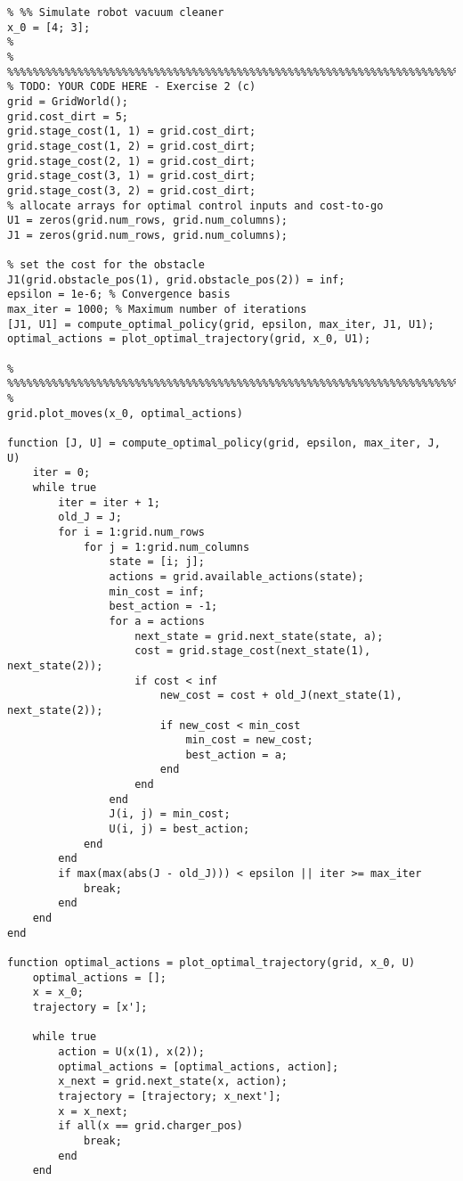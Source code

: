\documentclass[8pt, a4paper, oneside, justified]{article}
\numberwithin{equation}{section}
\begin{document}
\begin{lstlisting}
% %% Simulate robot vacuum cleaner
x_0 = [4; 3];
% 
% %%%%%%%%%%%%%%%%%%%%%%%%%%%%%%%%%%%%%%%%%%%%%%%%%%%%%%%%%%%%%%%%%%%%%%%%%%%
% TODO: YOUR CODE HERE - Exercise 2 (c)
grid = GridWorld();
grid.cost_dirt = 5;
grid.stage_cost(1, 1) = grid.cost_dirt;
grid.stage_cost(1, 2) = grid.cost_dirt;
grid.stage_cost(2, 1) = grid.cost_dirt;
grid.stage_cost(3, 1) = grid.cost_dirt;
grid.stage_cost(3, 2) = grid.cost_dirt;
% allocate arrays for optimal control inputs and cost-to-go 
U1 = zeros(grid.num_rows, grid.num_columns);
J1 = zeros(grid.num_rows, grid.num_columns);

% set the cost for the obstacle
J1(grid.obstacle_pos(1), grid.obstacle_pos(2)) = inf;
epsilon = 1e-6; % Convergence basis
max_iter = 1000; % Maximum number of iterations
[J1, U1] = compute_optimal_policy(grid, epsilon, max_iter, J1, U1);
optimal_actions = plot_optimal_trajectory(grid, x_0, U1);

% %%%%%%%%%%%%%%%%%%%%%%%%%%%%%%%%%%%%%%%%%%%%%%%%%%%%%%%%%%%%%%%%%%%%%%%%%%%
% 
grid.plot_moves(x_0, optimal_actions)

function [J, U] = compute_optimal_policy(grid, epsilon, max_iter, J, U)
    iter = 0;
    while true
        iter = iter + 1;
        old_J = J;
        for i = 1:grid.num_rows
            for j = 1:grid.num_columns
                state = [i; j];
                actions = grid.available_actions(state);
                min_cost = inf;
                best_action = -1;
                for a = actions
                    next_state = grid.next_state(state, a);
                    cost = grid.stage_cost(next_state(1), next_state(2));
                    if cost < inf
                        new_cost = cost + old_J(next_state(1), next_state(2));
                        if new_cost < min_cost
                            min_cost = new_cost;
                            best_action = a;
                        end
                    end
                end
                J(i, j) = min_cost;
                U(i, j) = best_action;
            end
        end
        if max(max(abs(J - old_J))) < epsilon || iter >= max_iter
            break;
        end
    end
end

function optimal_actions = plot_optimal_trajectory(grid, x_0, U)
    optimal_actions = [];
    x = x_0;
    trajectory = [x'];

    while true
        action = U(x(1), x(2));
        optimal_actions = [optimal_actions, action];
        x_next = grid.next_state(x, action);
        trajectory = [trajectory; x_next'];
        x = x_next;
        if all(x == grid.charger_pos)
            break;
        end
    end


\end{lstlisting}
\end{document}
